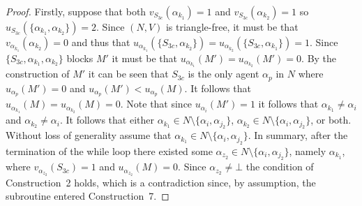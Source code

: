\begin{proof}
Firstly, suppose that both $v_{S_{3c}}(\alpha_{k_1})=1$ and $v_{S_{3c}}(\alpha_{k_2})=1$ so $u_{S_{3c}}(\{ \alpha_{k_1}, \alpha_{k_2} \})=2$. Since $(N, V)$ is triangle-free, it must be that $v_{\alpha_{k_1}}(\alpha_{k_2}) = 0$ and thus that $u_{\alpha_{k_1}}(\{ S_{3c}, \alpha_{k_2} \}) = u_{\alpha_{k_2}}(\{ S_{3c}, \alpha_{k_1} \}) = 1$. Since $\{ S_{3c}, \alpha_{k_1}, \alpha_{k_2} \}$ blocks $M'$ it must be that $u_{\alpha_{k_1}}(M')=u_{\alpha_{k_2}}(M')=0$. By the construction of $M'$ it can be seen that $S_{3c}$ is the only agent $\alpha_p$ in $N$ where $u_{\alpha_p}(M')=0$ and $u_{\alpha_p}(M') < u_{\alpha_p}(M)$. It follows that $u_{\alpha_{k_1}}(M)=u_{\alpha_{k_2}}(M)=0$. Note that since $u_{\alpha_i}(M')=1$ it follows that $\alpha_{k_1}\neq \alpha_i$ and $\alpha_{k_2}\neq \alpha_i$. It follows that either $\alpha_{k_1}\in N \setminus \{ \alpha_i, \alpha_{j_2} \}$, $\alpha_{k_2}\in N \setminus \{ \alpha_i, \alpha_{j_2} \}$, or both. Without loss of generality assume that $\alpha_{k_1}\in N \setminus \{ \alpha_i, \alpha_{j_2} \}$. In summary, after the termination of the while loop there existed some $\alpha_{z_2} \in N\setminus \{\alpha_i, \alpha_{j_2} \}$, namely $\alpha_{k_1}$, where $v_{\alpha_{z_2}}(S_{3c})=1$ and $u_{\alpha_{z_2}}(M)=0$. Since $\alpha_{z_2}\neq \bot$ the condition of Construction~2 holds, which is a contradiction since, by assumption, the subroutine entered Construction~7. 


\end{proof}
